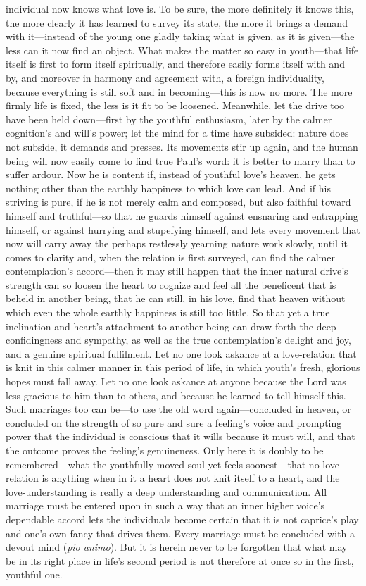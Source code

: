 \documentclass[12pt,a4paper]{book}
\begin{document}
individual now knows what love is. To be sure, the more definitely it knows
this, the more clearly it has learned to survey its state, the more it
brings a demand with it---instead of the young one gladly taking what is
given, as it is given---the less can it now find an object. What makes the
matter so easy in youth---that life itself is first to form itself
spiritually, and therefore easily forms itself with and by, and moreover in
harmony and agreement with, a foreign individuality, because everything is
still soft and in becoming---this is now no more. The more firmly life is
fixed, the less is it fit to be loosened. Meanwhile, let the drive too have
been held down---first by the youthful enthusiasm, later by the calmer
cognition's and will's power; let the mind for a time have subsided: nature
does not subside, it demands and presses. Its movements stir up again, and
the human being will now easily come to find true Paul's word: it is better
to marry than to suffer ardour. Now he is content if, instead of youthful
love's heaven, he gets nothing other than the earthly happiness to which
love can lead. And if his striving is pure, if he is not merely calm and
composed, but also faithful toward himself and truthful---so that he guards
himself against ensnaring and entrapping himself, or against hurrying and
stupefying himself, and lets every movement that now will carry away the
perhaps restlessly yearning nature work slowly, until it comes to clarity
and, when the relation is first surveyed, can find the calmer
contemplation's accord---then it may still happen that the inner natural
drive's strength can so loosen the heart to cognize and feel all the
beneficent that is beheld in another being, that he can still, in his love,
find that heaven without which even the whole earthly happiness is still too
little. So that yet a true inclination and heart's attachment to another
being can draw forth the deep confidingness and sympathy, as well as the
true contemplation's delight and joy, and a genuine spiritual fulfilment.
Let no one look askance at a love-relation that is knit in this calmer
manner in this period of life, in which youth's fresh, glorious hopes must
fall away. Let no one look askance at anyone because the Lord was less
gracious to him than to others, and because he learned to tell himself
this. Such marriages too can be---to use the old word again---concluded in
heaven, or concluded on the strength of so pure and sure a feeling's voice
and prompting power that the individual is conscious that it wills because
it must will, and that the outcome proves the feeling's genuineness. Only
here it is doubly to be remembered---what the youthfully moved soul yet
feels soonest---that no love-relation is anything when in it a heart does
not knit itself to a heart, and the love-understanding is really a deep
understanding and communication. All marriage must be entered upon in such
a way that an inner higher voice's dependable accord lets the individuals
become certain that it is not caprice's play and one's own fancy that
drives them. Every marriage must be concluded with a devout mind
(\textit{pio animo}). But it is herein never to be forgotten that what may
be in its right place in life's second period is not therefore at once so
in the first, youthful one.
\end{document}
